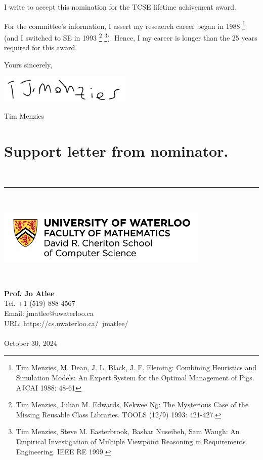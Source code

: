 \documentclass[10pt]{article}
\begin{document}
I write to accept this nomination for the TCSE lifetime achivement award. 

For the committee's information, I assert my reseaerch
career began in 1988 \footnote{Tim Menzies, M. Dean, J. L. Black, J. F. Fleming:
Combining Heuristics and Simulation Models: An Expert System for the Optimal Management of Pigs. 
AJCAI 1988: 48-61} 
(and I switched to SE in 1993 \footnote{Tim Menzies, Julian M. Edwards, Kekwee Ng:
The Mysterious Case of the Missing Reusable Class Libraries. TOOLS (12/9) 1993: 421-427.}
\footnote{
Tim Menzies, Steve M. Easterbrook, Bashar Nuseibeh, Sam Waugh:
An Empirical Investigation of Multiple Viewpoint Reasoning in Requirements Engineering. IEEE RE 1999.}).
Hence, I my career is longer than the 25 years required for this award.

Yours sincerely,


\includegraphics[width=2.5in]{sig.png}


Tim Menzies



\newpage
\section{Support letter from nominator.}

\vspace{0.2in}
~\hrule~

\begin{minipage}{4in}
\includegraphics[width=4in]{waterloo.png}
\end{minipage}\begin{minipage}{1in}
~
\end{minipage}\begin{minipage}{3in}
{\bf Prof. Jo Atlee}\\ 
Tel.   +1 (519) 888-4567\\
Email: jmatlee@uwaterloo.ca\\
URL: https://cs.uwaterloo.ca/~jmatlee/\\~\\
 October 30, 2024
\end{minipage}
\vspace{0.5in}
\end{document}
